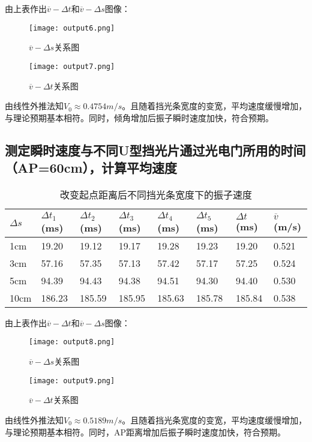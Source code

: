 \documentclass[UTF-8,twoside,cs4size]{ctexart}
\begin{document}
由上表作出$\overline{v} - \Delta t$和$\overline{v} - \Delta s$图像：
\begin{figure}[!h]
    \centering
    \texttt{[image: output6.png]}
    \caption{$\overline{v} - \Delta s$关系图}
\end{figure}
\begin{figure}[!h]
    \centering
    \texttt{[image: output7.png]}
    \caption{$\overline{v} - \Delta t$关系图}
\end{figure}
\newpage
由线性外推法知$V_0 \approx 0.4754 m/s$。且随着挡光条宽度的变宽，平均速度缓慢增加，与理论预期基本相符。同时，倾角增加后振子瞬时速度加快，符合预期。

\subsection{测定瞬时速度与不同U型挡光片通过光电门所用的时间（AP=60cm），计算平均速度}
\begin{table}[!h]
    \centering
    \renewcommand\arraystretch{1.7}
    \begin{tabular}{|l|l|l|l|l|l|l|l|}
        \hline
        $\Delta s$&$\Delta t_1$(ms) &$\Delta t_2$(ms)&$\Delta t_3$(ms) &$\Delta t_4$(ms)&$\Delta t_5$ (ms)&$\Delta t$(ms)&$\overline{v}$(m/s)\\\hline
        1cm&19.20&19.12&19.17&19.28&19.23&19.20&0.521 \\\hline
        3cm&57.16&57.35&57.13&57.42&57.17&57.25&0.524\\\hline
        5cm&94.39&94.43&94.38&94.51&94.30&94.40&0.530\\\hline
        10cm&186.23&185.59&185.95&185.63&185.78&185.84&0.538\\\hline
    \end{tabular}
    \caption{改变起点距离后不同挡光条宽度下的振子速度}
\end{table}

由上表作出$\overline{v} - \Delta t$和$\overline{v} - \Delta s$图像：
\newpage
\begin{figure}[!h]
    \centering
    \texttt{[image: output8.png]}
    \caption{$\overline{v} - \Delta s$关系图}
\end{figure}
\begin{figure}[!h]
    \centering
    \texttt{[image: output9.png]}
    \caption{$\overline{v} - \Delta t$关系图}
\end{figure}
由线性外推法知$V_0 \approx 0.5189 m/s$。且随着挡光条宽度的变宽，平均速度缓慢增加，与理论预期基本相符。同时，AP距离增加后振子瞬时速度加快，符合预期。
\end{document}
